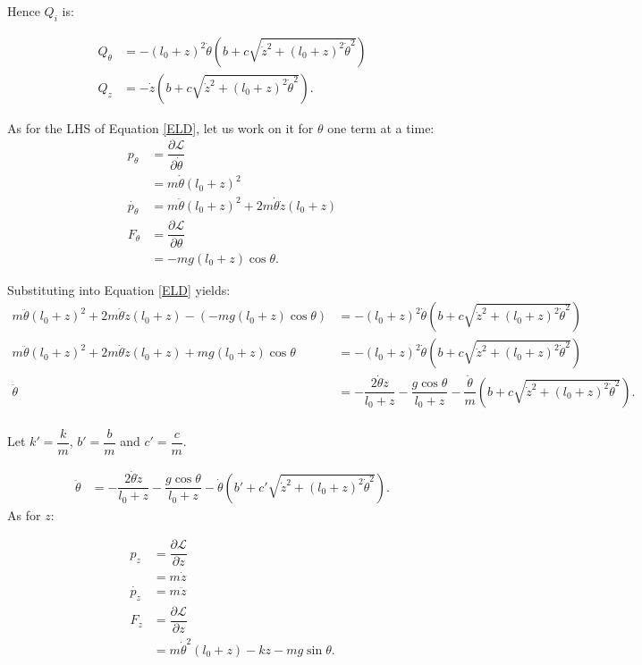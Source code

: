 \documentclass[12pt,a4paper,portrait]{article}
\begin{document}
Hence $Q_i$ is:

\begin{align*}
	Q_{\theta} &= -(l_0+z)^2 \dot{\theta} \left(b+c\sqrt{\dot{z}^2+(l_0+z)^2\dot{\theta}^2}\right) \\
	Q_z &= -\dot{z}\left(b+c\sqrt{\dot{z}^2+(l_0+z)^2\dot{\theta}^2}\right).
\end{align*}

As for the LHS of Equation \eqref{ELD}, let us work on it for $\theta$ one term at a time:
\begin{align*}
	p_{\theta} &= \dfrac{\partial \mathcal{L}}{\partial \dot{\theta}} \\
	&= m\dot{\theta}(l_0+z)^2 \\
	\dot{p_{\theta}} &= m\ddot{\theta} (l_0+z)^2 + 2m\dot{\theta}\dot{z}(l_0+z) \\
	F_{\theta} &= \dfrac{\partial \mathcal{L}}{\partial \theta} \\
	&= -mg(l_0+z)\cos{\theta}.
\end{align*}

Substituting into Equation \eqref{ELD} yields:
\begin{align*}
	m\ddot{\theta} (l_0+z)^2 + 2m\dot{\theta}\dot{z}(l_0+z) - (-mg(l_0+z)\cos{\theta}) &= -(l_0+z)^2 \dot{\theta} \left(b+c\sqrt{\dot{z}^2+(l_0+z)^2\dot{\theta}^2}\right) \\
	m\ddot{\theta} (l_0+z)^2 + 2m\dot{\theta}\dot{z}(l_0+z) +mg(l_0+z)\cos{\theta} &= -(l_0+z)^2 \dot{\theta} \left(b+c\sqrt{\dot{z}^2+(l_0+z)^2\dot{\theta}^2}\right) \\
	\ddot{\theta} &= -\dfrac{2\dot{\theta}\dot{z}}{l_0+z} - \dfrac{g\cos{\theta}}{l_0+z} -\dfrac{\dot{\theta}}{m} \left(b+c\sqrt{\dot{z}^2+(l_0+z)^2\dot{\theta}^2}\right). \\
\end{align*}

Let $k'=\dfrac{k}{m}$, $b'=\dfrac{b}{m}$ and $c'=\dfrac{c}{m}$.

\begin{align*}
	\ddot{\theta} &= -\dfrac{2\dot{\theta}\dot{z}}{l_0+z} - \dfrac{g\cos{\theta}}{l_0+z} -\dot{\theta} \left(b'+c'\sqrt{\dot{z}^2+(l_0+z)^2\dot{\theta}^2}\right).
\end{align*}
As for $z$:

\begin{align*}
	p_z &= \dfrac{\partial \mathcal{L}}{\partial \dot{z}} \\
	&= m\dot{z} \\
	\dot{p_z} &= m\ddot{z} \\
	F_z &= \dfrac{\partial \mathcal{L}}{\partial z} \\
	&= m\dot{\theta}^2(l_0+z) - kz - mg\sin{\theta}.
\end{align*}
\end{document}
